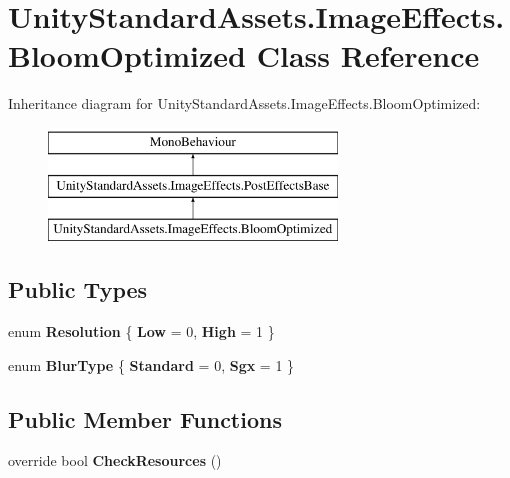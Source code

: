 \hypertarget{class_unity_standard_assets_1_1_image_effects_1_1_bloom_optimized}{}\section{Unity\+Standard\+Assets.\+Image\+Effects.\+Bloom\+Optimized Class Reference}
\label{class_unity_standard_assets_1_1_image_effects_1_1_bloom_optimized}
Inheritance diagram for Unity\+Standard\+Assets.\+Image\+Effects.\+Bloom\+Optimized\+:\begin{figure}[H]
\begin{center}
\leavevmode
\includegraphics[height=3.000000cm]{class_unity_standard_assets_1_1_image_effects_1_1_bloom_optimized}
\end{center}
\end{figure}
\subsection*{Public Types}
\begin{DoxyCompactItemize}
\item 
enum {\bfseries Resolution} \{ {\bfseries Low} = 0, 
{\bfseries High} = 1
 \}\hypertarget{class_unity_standard_assets_1_1_image_effects_1_1_bloom_optimized_ab937d5a1d6ab55f891d5a0ada3ffed8f}{}\label{class_unity_standard_assets_1_1_image_effects_1_1_bloom_optimized_ab937d5a1d6ab55f891d5a0ada3ffed8f}

\item 
enum {\bfseries Blur\+Type} \{ {\bfseries Standard} = 0, 
{\bfseries Sgx} = 1
 \}\hypertarget{class_unity_standard_assets_1_1_image_effects_1_1_bloom_optimized_a79317d54ae2cad9590852d264ebeabbf}{}\label{class_unity_standard_assets_1_1_image_effects_1_1_bloom_optimized_a79317d54ae2cad9590852d264ebeabbf}

\end{DoxyCompactItemize}
\subsection*{Public Member Functions}
\begin{DoxyCompactItemize}
\item 
override bool {\bfseries Check\+Resources} ()\hypertarget{class_unity_standard_assets_1_1_image_effects_1_1_bloom_optimized_acfddd1e3d1f02d7aa8abe96ba18da27f}{}\label{class_unity_standard_assets_1_1_image_effects_1_1_bloom_optimized_acfddd1e3d1f02d7aa8abe96ba18da27f}

\end{DoxyCompactItemize}
